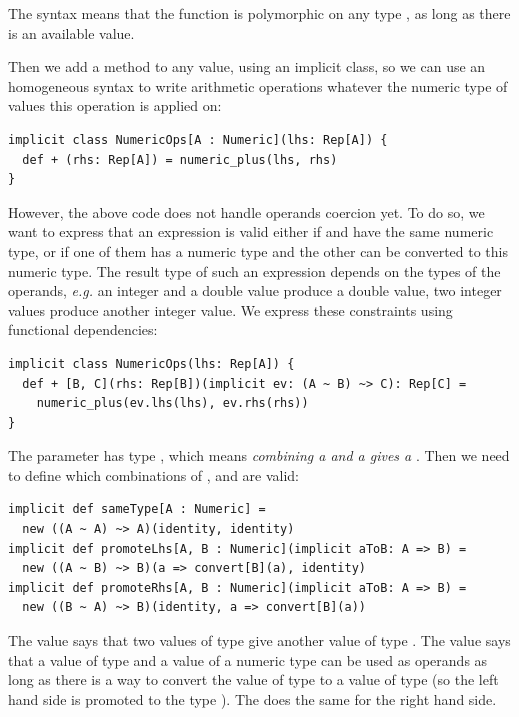 \documentclass[american,english,runningheads]{llncs}
\newcommand{\eg}{\emph{e.g.}}
\begin{document}
The  syntax means that the function is polymorphic on any type , as long as there is an
available  value.

Then we add a \code{+} method to any  value, using an implicit class, so we can use an homogeneous
syntax to write arithmetic operations whatever the numeric type of values this operation is applied on:

\begin{lstlisting}
implicit class NumericOps[A : Numeric](lhs: Rep[A]) {
  def + (rhs: Rep[A]) = numeric_plus(lhs, rhs)
}
\end{lstlisting}

However, the above code does not handle operands coercion yet. To do so, we want to express that an expression
 is valid either if  and  have the same numeric type, or if one of them has a numeric
type and the other can be converted to this numeric type. The result type of such an expression depends on the types
of the operands, \eg{} an integer and a double value produce a double value, two integer values produce another
integer value. We express these constraints using functional dependencies:

\begin{lstlisting}
implicit class NumericOps(lhs: Rep[A]) {
  def + [B, C](rhs: Rep[B])(implicit ev: (A ~ B) ~> C): Rep[C] =
    numeric_plus(ev.lhs(lhs), ev.rhs(rhs))
}
\end{lstlisting}

The  parameter has type , which means \emph{combining a  and a  gives a
}. Then we need to define which combinations of ,  and  are valid:

\begin{lstlisting}[caption=Numeric operands constraints,label=type-coercion-constraints]
implicit def sameType[A : Numeric] =
  new ((A ~ A) ~> A)(identity, identity)
implicit def promoteLhs[A, B : Numeric](implicit aToB: A => B) =
  new ((A ~ B) ~> B)(a => convert[B](a), identity)
implicit def promoteRhs[A, B : Numeric](implicit aToB: A => B) =
  new ((B ~ A) ~> B)(identity, a => convert[B](a))
\end{lstlisting}

The  value says that two values of type  give another value of type . The
 value says that a value of type  and a value of a numeric type  can be used as
operands as long as there is a way to convert the value of type  to a value of type  (so the left
hand side is promoted to the type ). The  does the same for the right hand side.
\end{document}
